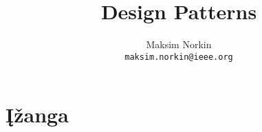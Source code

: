 \documentclass[10pt]{IEEEtran}
\author{Maksim Norkin\\ \texttt{maksim.norkin@ieee.org}}
\title{Design Patterns}
\begin{document}
	\maketitle

	\section{Įžanga}
\end{document}

